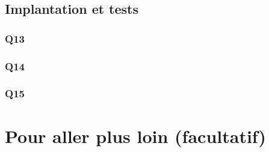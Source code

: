 \documentclass[a4paper]{memoir}
\begin{document}
	\subsection{Implantation et tests}
	\subsubsection{Q13}
	\subsubsection{Q14}
	\subsubsection{Q15}
	
	\section{Pour aller plus loin (facultatif)}
	
\end{document}
